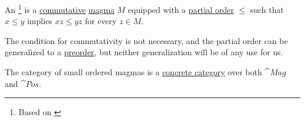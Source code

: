 \begin{definition}\label{def:ordered_magma}\mimprovised
  An \footnote{Based on \cite[224]{Golan2010}} is a \hyperref[def:magma/commutative]{commutative} \hyperref[def:magma]{magma} \( M \) equipped with a \hyperref[def:partially_ordered_set]{partial order} \( \leq \) such that \( x \leq y \) implies \( xz \leq yz \) for every \( z \in M \).

  The condition for commutativity is not necessary, and the partial order can be generalized to a \hyperref[def:preordered_set]{preorder}, but neither generalization will be of any use for us.

  The category of small ordered magmas is a \hyperref[def:concrete_category]{concrete category} over both \hyperref[def:magma/category]{\( \cat{Mag} \)} and \hyperref[def:partially_ordered_set/category]{\( \cat{Pos} \)}.
\end{definition}

